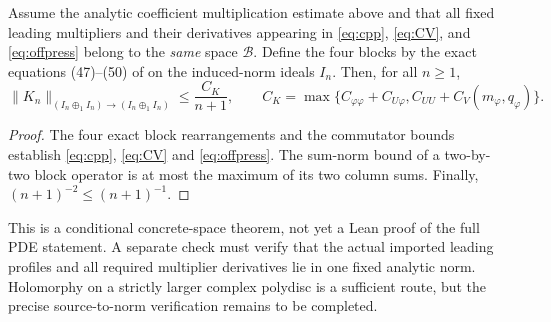 \begin{theorem}
\label{thm:fourblock}
Assume the analytic coefficient multiplication estimate above and
that all fixed leading multipliers and their derivatives appearing
in \eqref{eq:cpp}, \eqref{eq:CV}, and \eqref{eq:offpress}
belong to the \emph{same} space $\mathcal B$. Define the four blocks
by the exact equations (47)--(50) of \cite{newton2026} on the
induced-norm ideals $I_n$. Then, for all $n\ge1$,
\[
 \|K_n\|_{(I_n\oplus_1 I_n)\to(I_n\oplus_1 I_n)}
 \le\frac{C_K}{n+1},\qquad
 C_K=\max\{C_{\varphi\varphi}+C_{U\varphi},
 C_{UU}+C_V(m_\varphi,q_\varphi)\}.
\]
\end{theorem}
\begin{proof}
The four exact block rearrangements and the commutator bounds
establish \eqref{eq:cpp}, \eqref{eq:CV} and \eqref{eq:offpress}.
The sum-norm bound of a two-by-two block operator is at most the
maximum of its two column sums. Finally,
$(n+1)^{-2}\le(n+1)^{-1}$.
\end{proof}
This is a conditional concrete-space theorem, not yet a Lean proof of
the full PDE statement. A separate check must verify that the actual
imported leading profiles and all required multiplier derivatives lie
in one fixed analytic norm. Holomorphy on a strictly larger complex
polydisc is a sufficient route, but the precise source-to-norm
verification remains to be completed.

